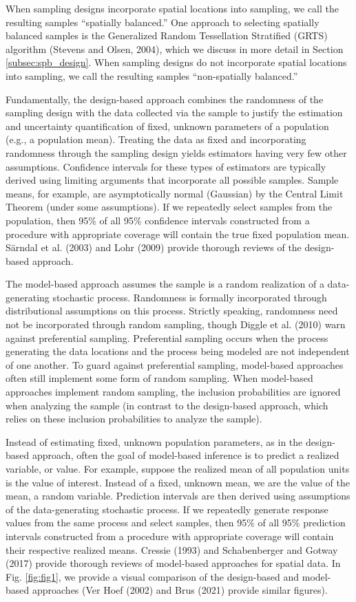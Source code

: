 \documentclass[]{elsarticle} %
\begin{document}
When sampling designs incorporate spatial locations into sampling, we
call the resulting samples ``spatially balanced.'' One approach to
selecting spatially balanced samples is the Generalized Random
Tessellation Stratified (GRTS) algorithm (Stevens and Olsen, 2004),
which we discuss in more detail in Section \ref{subsec:spb_design}. When
sampling designs do not incorporate spatial locations into sampling, we
call the resulting samples ``non-spatially balanced.''

Fundamentally, the design-based approach combines the randomness of the
sampling design with the data collected via the sample to justify the
estimation and uncertainty quantification of fixed, unknown parameters
of a population (e.g., a population mean). Treating the data as fixed
and incorporating randomness through the sampling design yields
estimators having very few other assumptions. Confidence intervals for
these types of estimators are typically derived using limiting arguments
that incorporate all possible samples. Sample means, for example, are
asymptotically normal (Gaussian) by the Central Limit Theorem (under
some assumptions). If we repeatedly select samples from the population,
then 95\% of all 95\% confidence intervals constructed from a procedure
with appropriate coverage will contain the true fixed population mean.
Särndal et al. (2003) and Lohr (2009) provide thorough reviews of the
design-based approach.

The model-based approach assumes the sample is a random realization of a
data-generating stochastic process. Randomness is formally incorporated
through distributional assumptions on this process. Strictly speaking,
randomness need not be incorporated through random sampling, though
Diggle et al. (2010) warn against preferential sampling. Preferential
sampling occurs when the process generating the data locations and the
process being modeled are not independent of one another. To guard
against preferential sampling, model-based approaches often still
implement some form of random sampling. When model-based approaches
implement random sampling, the inclusion probabilities are ignored when
analyzing the sample (in contrast to the design-based approach, which
relies on these inclusion probabilities to analyze the sample).

Instead of estimating fixed, unknown population parameters, as in the
design-based approach, often the goal of model-based inference is to
predict a realized variable, or value. For example, suppose the realized
mean of all population units is the value of interest. Instead of a
fixed, unknown mean, we are the value of the mean, a random variable.
Prediction intervals are then derived using assumptions of the
data-generating stochastic process. If we repeatedly generate response
values from the same process and select samples, then 95\% of all 95\%
prediction intervals constructed from a procedure with appropriate
coverage will contain their respective realized means. Cressie (1993)
and Schabenberger and Gotway (2017) provide thorough reviews of
model-based approaches for spatial data. In Fig. \ref{fig:fig1}, we
provide a visual comparison of the design-based and model-based
approaches (Ver Hoef (2002) and Brus (2021) provide similar figures).
\end{document}
